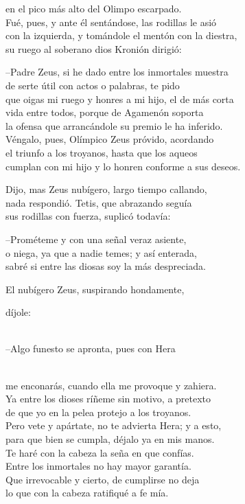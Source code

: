 \documentclass[11pt,twoside]{article}
\newcommand{\dlgo}[2]{\sbox{\dbox}{#1}\parbox[t]{\linewidth}{#1\strut\\[0pt]\hspace*{\wd\dbox}\hspace{\fontdimen2\font}#2\strut}}
\begin{document}
en el pico más alto del Olimpo escarpado.\\
Fué, pues, y ante él sentándose, las rodillas le asió\\
con la izquierda, y tomándole el mentón con la diestra,\\
su ruego al soberano dios Kronión dirigió:\par
--Padre Zeus, si he dado entre los inmortales muestra\\
de serte útil con actos o palabras, te pido\\
que oigas mi ruego y honres a mi hijo, el de más corta\\
vida entre todos, porque de Agamenón soporta\\
la ofensa que arrancándole su premio le ha inferido.\\
Véngalo, pues, Olímpico Zeus próvido, acordando\\
el triunfo a los troyanos, hasta que los aqueos\\
cumplan con mi hijo y lo honren conforme a sus deseos.\par
Dijo, mas Zeus nubígero, largo tiempo callando,\\
nada respondió. Tetis, que abrazando seguía\\
sus rodillas con fuerza, suplicó todavía:\par
--Prométeme y con una señal veraz asiente,\\
o niega, ya que a nadie temes; y así enterada,\\
sabré si entre las diosas soy la más despreciada.\par
El nubígero Zeus, suspirando hondamente,\\
\dlgo{díjole:}{--Algo funesto se apronta, pues con Hera}\\
me enconarás, cuando ella me provoque y zahiera.\\
Ya entre los dioses ríñeme sin motivo, a pretexto\\
de que yo en la pelea protejo a los troyanos.\\
Pero vete y apártate, no te advierta Hera; y a esto,\\
para que bien se cumpla, déjalo ya en mis manos.\\
Te haré con la cabeza la seña en que confías.\\
Entre los inmortales no hay mayor garantía.\\
Que irrevocable y cierto, de cumplirse no deja\\
lo que con la cabeza ratifiqué a fe mía.\par
\end{document}
